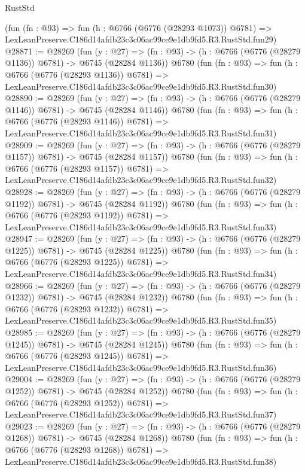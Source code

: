 \begin{lexlean}{RustStd}
\begin{coremodule}
    (fun (fn : @93) =>
    fun (h : @6766 (@6776 (@28293 @1073)) @6781) =>
    LexLeanPreserve.C186d14afdb23c3c06ac99ce9e1db9fd5.R3.RustStd.fun29)
@28871 := @28269
    (fun (y : @27) =>
    (fn : @93) -> (h : @6766 (@6776 (@28279 @1136)) @6781) -> @6745 (@28284 @1136))
    @6780
    (fun (fn : @93) =>
    fun (h : @6766 (@6776 (@28293 @1136)) @6781) =>
    LexLeanPreserve.C186d14afdb23c3c06ac99ce9e1db9fd5.R3.RustStd.fun30)
@28890 := @28269
    (fun (y : @27) =>
    (fn : @93) -> (h : @6766 (@6776 (@28279 @1146)) @6781) -> @6745 (@28284 @1146))
    @6780
    (fun (fn : @93) =>
    fun (h : @6766 (@6776 (@28293 @1146)) @6781) =>
    LexLeanPreserve.C186d14afdb23c3c06ac99ce9e1db9fd5.R3.RustStd.fun31)
@28909 := @28269
    (fun (y : @27) =>
    (fn : @93) -> (h : @6766 (@6776 (@28279 @1157)) @6781) -> @6745 (@28284 @1157))
    @6780
    (fun (fn : @93) =>
    fun (h : @6766 (@6776 (@28293 @1157)) @6781) =>
    LexLeanPreserve.C186d14afdb23c3c06ac99ce9e1db9fd5.R3.RustStd.fun32)
@28928 := @28269
    (fun (y : @27) =>
    (fn : @93) -> (h : @6766 (@6776 (@28279 @1192)) @6781) -> @6745 (@28284 @1192))
    @6780
    (fun (fn : @93) =>
    fun (h : @6766 (@6776 (@28293 @1192)) @6781) =>
    LexLeanPreserve.C186d14afdb23c3c06ac99ce9e1db9fd5.R3.RustStd.fun33)
@28947 := @28269
    (fun (y : @27) =>
    (fn : @93) -> (h : @6766 (@6776 (@28279 @1225)) @6781) -> @6745 (@28284 @1225))
    @6780
    (fun (fn : @93) =>
    fun (h : @6766 (@6776 (@28293 @1225)) @6781) =>
    LexLeanPreserve.C186d14afdb23c3c06ac99ce9e1db9fd5.R3.RustStd.fun34)
@28966 := @28269
    (fun (y : @27) =>
    (fn : @93) -> (h : @6766 (@6776 (@28279 @1232)) @6781) -> @6745 (@28284 @1232))
    @6780
    (fun (fn : @93) =>
    fun (h : @6766 (@6776 (@28293 @1232)) @6781) =>
    LexLeanPreserve.C186d14afdb23c3c06ac99ce9e1db9fd5.R3.RustStd.fun35)
@28985 := @28269
    (fun (y : @27) =>
    (fn : @93) -> (h : @6766 (@6776 (@28279 @1245)) @6781) -> @6745 (@28284 @1245))
    @6780
    (fun (fn : @93) =>
    fun (h : @6766 (@6776 (@28293 @1245)) @6781) =>
    LexLeanPreserve.C186d14afdb23c3c06ac99ce9e1db9fd5.R3.RustStd.fun36)
@29004 := @28269
    (fun (y : @27) =>
    (fn : @93) -> (h : @6766 (@6776 (@28279 @1252)) @6781) -> @6745 (@28284 @1252))
    @6780
    (fun (fn : @93) =>
    fun (h : @6766 (@6776 (@28293 @1252)) @6781) =>
    LexLeanPreserve.C186d14afdb23c3c06ac99ce9e1db9fd5.R3.RustStd.fun37)
@29023 := @28269
    (fun (y : @27) =>
    (fn : @93) -> (h : @6766 (@6776 (@28279 @1268)) @6781) -> @6745 (@28284 @1268))
    @6780
    (fun (fn : @93) =>
    fun (h : @6766 (@6776 (@28293 @1268)) @6781) =>
    LexLeanPreserve.C186d14afdb23c3c06ac99ce9e1db9fd5.R3.RustStd.fun38)

\end{coremodule}
\end{lexlean}

